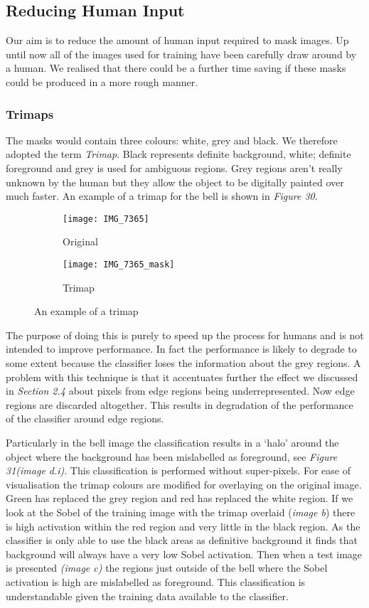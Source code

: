 \documentclass[12pt]{IIBproject}
\begin{document}
\subsection{Reducing Human Input}
Our aim is to reduce the amount of human input required to mask images. Up until now all of the images used for training have been carefully draw around by a human. We realised that there could be a further time saving if these masks could be produced in a more rough manner. 
\subsubsection{Trimaps}
The masks would contain three colours: white, grey and black. We therefore adopted the term \emph{Trimap}. Black represents definite background, white; definite foreground and grey is used for ambiguous regions. Grey regions aren't really unknown by the human but they allow the object to be digitally painted over much faster. An example of a trimap for the bell is shown in \emph{Figure 30}. 

\begin{figure}[H]
\centering
\begin{subfigure}{.45\textwidth}
  \centering
  \texttt{[image: IMG\_7365]}
  \caption{Original}
  \label{fig:sub2}
\end{subfigure}
\begin{subfigure}{.45\textwidth}
  \centering
  \texttt{[image: IMG\_7365\_mask]}
  \caption{Trimap}
  \label{fig:sub1}
\end{subfigure}%


\caption{An example of a trimap}
\label{fig:test}
\end{figure}
The purpose of doing this is purely to speed up the process for humans and is not intended to improve performance. In fact the performance is likely to degrade to some extent because the classifier loses the information about the grey regions. 
A problem with this technique is that it accentuates further the effect we discussed in \emph{Section 2.4} about pixels from edge regions being underrepresented. Now edge regions are discarded altogether. This results in degradation of the performance of the classifier around edge regions. 

Particularly in the bell image the classification results in a `halo' around the object where the background has been mislabelled as foreground, see \emph{Figure 31(image d.i)}. This classification is performed without super-pixels. For ease of visualisation the trimap colours are modified for overlaying on the original image. Green has replaced the grey region and red has replaced the white region. If we look at the Sobel of the training image with the trimap overlaid (\emph{image b}) there is high activation within the red region and very little in the black region. As the classifier is only able to use the black areas as definitive background it finds that background will always have a very low Sobel activation. Then when a test image is presented \emph{(image c)} the regions just outside of the bell where the Sobel activation is high are mislabelled as foreground. This classification is understandable given the training data available to the classifier.
\end{document}
